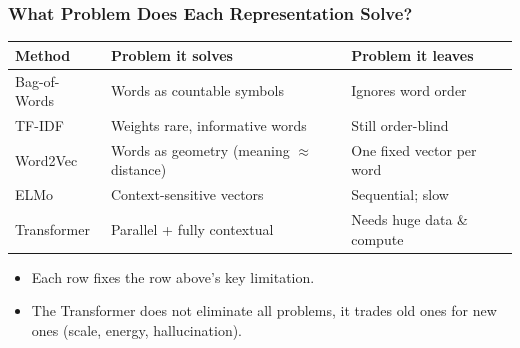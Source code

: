 \begin{frame}[fragile]\frametitle{What Problem Does Each Representation Solve?}
\begin{center}
\small
\renewcommand{\arraystretch}{1.3}
\begin{tabular}{|p{2cm}|p{2.5cm}|p{2.5cm}|}
\hline
\textbf{Method} & \textbf{Problem it solves} & \textbf{Problem it leaves} \\
\hline
Bag-of-Words & Words as countable symbols & Ignores word order \\
TF-IDF       & Weights rare, informative words & Still order-blind \\
Word2Vec     & Words as geometry (meaning $\approx$ distance) & One fixed vector per word \\
ELMo         & Context-sensitive vectors & Sequential; slow \\
Transformer  & Parallel + fully contextual & Needs huge data \& compute \\
\hline
\end{tabular}
\end{center}
\vspace{0.5em}
\begin{itemize}
  \item Each row fixes the row above's key limitation.
  \item The Transformer does not eliminate all problems, it trades old
    ones for new ones (scale, energy, hallucination).
\end{itemize}
\end{frame}






